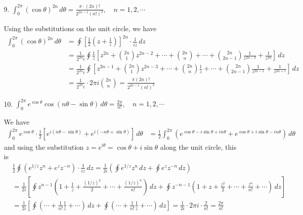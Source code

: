 \documentclass{article}
\begin{document}
\begin{itemize}
	\item[9.] $\int_0^{2\pi} (\cos\theta)^{2n}\, d\theta = \frac{\pi\cdot (2n)!}{2^{2n-1}(n!)^2}, \quad n=1, 2, \cdots$
		\begin{soln}
			Using the substitutions on the unit circle, we have
			\begin{align*}
				\int_0^{2\pi} (\cos\theta)^{2n}\, d\theta &= \oint \left[ \frac{1}{2}\left( z+\frac{1}{z} \right) \right]^{2n}\cdot \frac{1}{iz}\, dz \\
				&= \frac{1}{2^{2n}i}\oint\frac{1}{z}\left[ z^{2n} + \binom{2n}{1}z^{2n-2} + \cdots + \binom{2n}{n} + \cdots + \binom{2n}{2n-1} \frac{1}{z^{2n-2}} + \frac{1}{z^{2n}} \right]\, dz \\
				&= \frac{1}{2^{2n}i}\oint \left[ z^{2n-1} + \binom{2n}{1}z^{2n-3} + \cdots + \binom{2n}{n} \frac{1}{z} + \cdots + \binom{2n}{2n-1}\frac{1}{z^{2n-1}} + \frac{1}{z^{2n+1}} \right]\, dz \\
				&= \frac{1}{2^{2n}i}\cdot 2\pi i \binom{2n}{n} = \frac{\pi (2n)!}{2^{2n-1}(n!)^2}
			\end{align*}
		\end{soln}

	\item[10.] $\int_{0}^{2\pi} e^{\cos \theta} \cos\left( n\theta-\sin \theta \right)\, d\theta = \frac{2\pi}{n!}, \quad n=1, 2, \cdots$
		\begin{soln}
			We have
			\begin{align*}
				\int_0^{2\pi} e^{\cos\theta} \cdot \frac{1}{2} \left[ e^{i( n\theta-\sin\theta)}+e^{i(-n\theta + \sin\theta)} \right]\, d\theta &= \frac{1}{2}\int_0^{2\pi} \left(e^{\cos\theta-i\sin\theta+in\theta} + e^{\cos\theta+i\sin\theta-in\theta}\right)\, d\theta
			\end{align*}
			and using the substitution $z=e^{i\theta}=\cos\theta + i\sin\theta$ along the unit circle, this is
			\begin{align*}
				&\frac{1}{2}\oint \left( e^{1/z}z^n + e^z z^{-n} \right)\cdot \frac{1}{iz}\, dz = \frac{1}{2i}\left(\oint e^{1/z}z^n\, dz + \oint e^z z^{-n}\, dz\right)\\
				&= \frac{1}{2i} \left[\oint z^{n-1}\left( 1+\frac{1}{z}+\frac{(1/z)^2}{2} + \cdots + \frac{(1/z)^n}{n!}\right)\, dz +\oint z^{-n-1} \left( 1+z+\frac{z^2}{2} + \cdots+ \frac{z^n}{n!} + \cdots \right)\, dz\right] \\
				&= \frac{1}{2i}\left[ \oint \left( \cdots + \frac{1}{n!}\frac{1}{z}+\cdots \right)\, dz + \oint \left( \cdots + \frac{1}{n!}\frac{1}{z} + \cdots \right)\, dz\right] = \frac{1}{2i}\cdot 2\pi i\cdot \frac{2}{n!} = \frac{2\pi}{n!}
			\end{align*}
		\end{soln}
		
\end{itemize}
\end{document}
